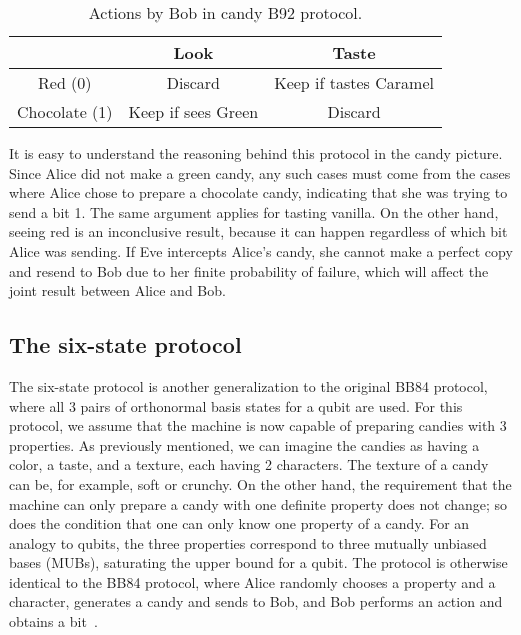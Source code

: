 \documentclass{article}
\begin{document}
\begin{table}[h!]
	\centering
	\begin{tabular}{ |c|c|c| } 
		\hline
		\backslashbox{Alice}{Bob} & Look & Taste \\ 
		\hline 
		Red (0) & Discard & Keep if tastes Caramel \\
		\hline 
		Chocolate (1) & Keep if sees Green & Discard \\ 
		\hline
	\end{tabular}
	\caption{Actions by Bob in candy B92 protocol.}
	\label{table3}
\end{table}

It is easy to understand the reasoning behind this protocol in the candy picture.
Since Alice did not make a green candy, any such cases must come from the cases where Alice chose to prepare a chocolate candy, indicating that she was trying to send a bit 1.
The same argument applies for tasting vanilla.
On the other hand, seeing red is an inconclusive result, because it can happen regardless of which bit Alice was sending.
If Eve intercepts Alice's candy, she cannot make a perfect copy and resend to Bob due to her finite probability of failure, which will affect the joint result between Alice and Bob.

\subsection{The six-state protocol}
The six-state protocol is another generalization to the original BB84 protocol, where all 3 pairs of orthonormal basis states for a qubit are used.
For this protocol, we assume that the machine is now capable of preparing candies with 3 properties.
As previously mentioned, we can imagine the candies as having a color, a taste, and a texture, each having 2 characters.
The texture of a candy can be, for example, soft or crunchy.
On the other hand, the requirement that the machine can only prepare a candy with one definite property does not change; so does the condition that one can only know one property of a candy.
For an analogy to qubits, the three properties correspond to three mutually unbiased bases (MUBs), saturating the upper bound for a qubit.
The protocol is otherwise identical to the BB84 protocol, where Alice randomly chooses a property and a character, generates a candy and sends to Bob, and Bob performs an action and obtains a bit~\cite{kato2016security}.
\end{document}
